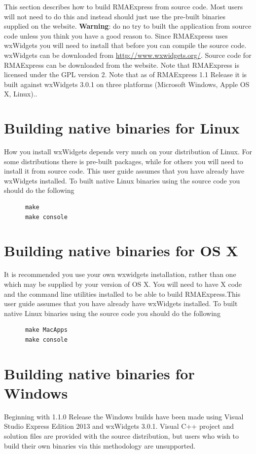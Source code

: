 \documentclass[11pt]{report}
\begin{document}
This section describes how to build RMAExpress from source code. Most users will not need to do this and instead should just use the pre-built binaries supplied on the website. {\bf Warning}: do no try to built the application from source code unless you think you have a good reason to. Since RMAExpress uses wxWidgets  you will need to install that before you can compile the source code. wxWidgets can be downloaded from \url{http://www.wxwidgets.org/}. Source code for RMAExpress can be downloaded from the website. Note that RMAExpress is licensed under the GPL version 2. Note that as of RMAExpress 1.1 Release it is built against wxWidgets 3.0.1 on three platforms (Microsoft Windows, Apple OS X, Linux)..

\section{Building native binaries for Linux}

How you install wxWidgets depends very much on your distribution of Linux. For some distributions there is pre-built packages, while for others you will need to install it from source code. This user guide assumes that you have already have wxWidgets installed. To built native Linux binaries using the source code you should do the following
\begin{verbatim}
      make
      make console
\end{verbatim}

\section{Building native binaries for OS X}

It is recommended you use your own wxwidgets installation, rather than one which may be supplied by your version of OS X. You will need to have X code and the command line utilities installed to be able to build RMAExpress.This user guide assumes that you have already have wxWidgets installed. To built native Linux binaries using the source code you should do the following
\begin{verbatim}
      make MacApps
      make console
\end{verbatim}

\section{Building native binaries for Windows}

Beginning with 1.1.0 Release the Windows builds have been made using Visual Studio Express Edition 2013 and wxWidgets 3.0.1. Visual C++ project and solution files are provided with the source distribution, but users who wish to build their own binaries via this methodology are unsupported.
\end{document}
